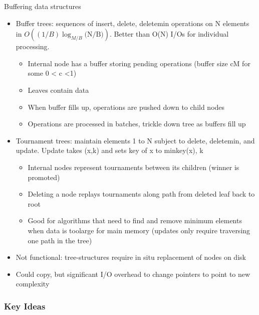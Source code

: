 Buffering data structures
\begin{itemize}
    \item Buffer trees: sequences of insert, delete, deletemin operations on N elements in $O((1/B)\log_{M/B}\text{(N/B)})$. Better than O(N) I/Os for individual processing.
    \begin{itemize}
        \item Internal node has a buffer storing pending operations (buffer size cM for some 0 < c <1)
        \item Leaves contain data
        \item When buffer fills up, operations are pushed down to child nodes
        \item Operations are processed in batches, trickle down tree as buffers fill up
    \end{itemize}
    \item Tournament trees: maintain elements 1 to N subject to delete, deletemin, and update. Update takes (x,k) and sets key of x to min{key(x), k}
    \begin{itemize}
        \item Internal nodes represent tournaments between its children (winner is promoted)
        \item Deleting a node replays tournaments along path from deleted leaf back to root
        \item Good for algorithms that need to find and remove minimum elements when data is toolarge for main memory (updates only require traversing one path in the tree)
    \end{itemize}
    \item Not functional: tree-structures require in situ replacement of nodes on disk
    \item Could copy, but significant I/O overhead to change pointers to point to new complexity
\end{itemize}

\subsubsection{Key Ideas}

